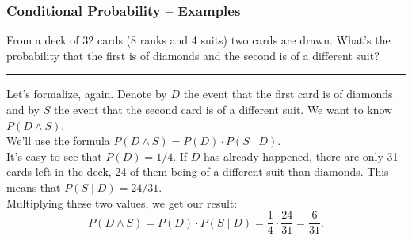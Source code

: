 \documentclass[aspectratio=169,11pt,usenames,dvipsnames,handout]{beamer}
\begin{document}
\begin{frame}
 \frametitle{Conditional Probability -- Examples}
 From a deck of 32 cards (8 ranks and 4 suits) two cards are drawn. What's the
 probability that the first is of diamonds and the second is of a different
 suit?
 \vspace{1em}
 \hrule
 Let's formalize, again. Denote by $D$ the event that the first card is of
 diamonds and by $S$ the event that the second card is of a different suit. We
 want to know $P(D \wedge S)$.\pause\\
 We'll use the formula $P(D \wedge S) = P(D) \cdot P(S \mid D)$.\pause\\
 It's easy to see that $P(D) = 1 / 4$. \pause
 If $D$ has already happened, there are only 31 cards left in the deck, 24 of
 them being of a different suit than diamonds. This means that $P(S \mid D) = 24
 / 31$.\pause\\
 Multiplying these two values, we get our result:
 \[
  P(D \wedge S) = P(D) \cdot P(S \mid D) = \frac{1}{4} \cdot \frac{24}{31} =
  \frac{6}{31}.
 \]
\end{frame}
\end{document}
